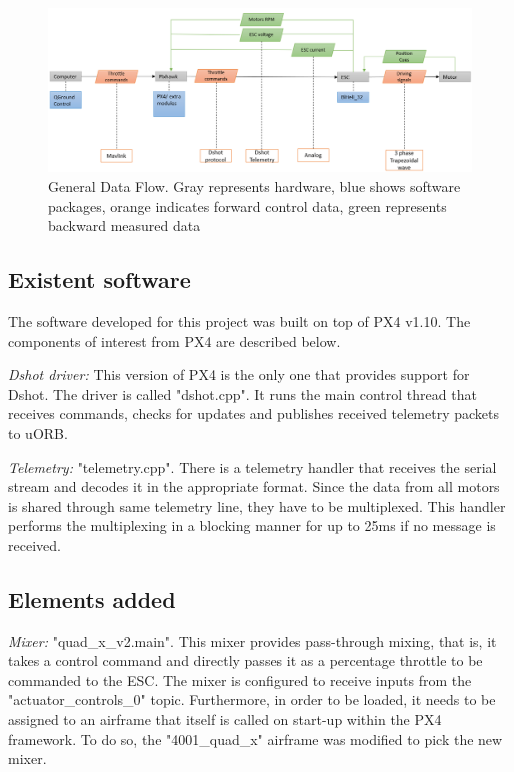 \begin{figure} 
    \centering
    \includegraphics[width=1.0\textwidth]{images/data_flow_diagram.PNG}
    \caption{General Data Flow. Gray represents hardware, blue shows software packages, orange indicates forward control data, green represents backward measured data}
    \label{fig:data_flow}
\end{figure}

\subsection{Existent software}
The software developed for this project was built on top of PX4 v1.10. The components of interest from PX4 are described below.
\newline

\textit{Dshot driver: } This version of PX4 is the only one that provides support for Dshot. The driver is called "dshot.cpp". It runs the main control thread that receives commands, checks for updates and publishes received telemetry packets to uORB.
\newline

\textit{Telemetry: } "telemetry.cpp". There is a telemetry handler that receives the serial stream and decodes it in the appropriate format. Since the data from all motors is shared through same telemetry line, they have to be multiplexed. This handler performs the multiplexing in a blocking manner for up to 25ms if no message is received.
\newline

\subsection{Elements added}

\textit{Mixer: } "quad\_x\_v2.main". This mixer provides pass-through mixing, that is, it takes a control command and directly passes it as a percentage throttle to be commanded to the ESC. The mixer is configured to receive inputs from the "actuator\_controls\_0" topic. Furthermore, in order to be loaded, it needs to be assigned to an airframe that itself is called on start-up within the PX4 framework. To do so, the "4001\_quad\_x" airframe was modified to pick the new mixer.
\newline

